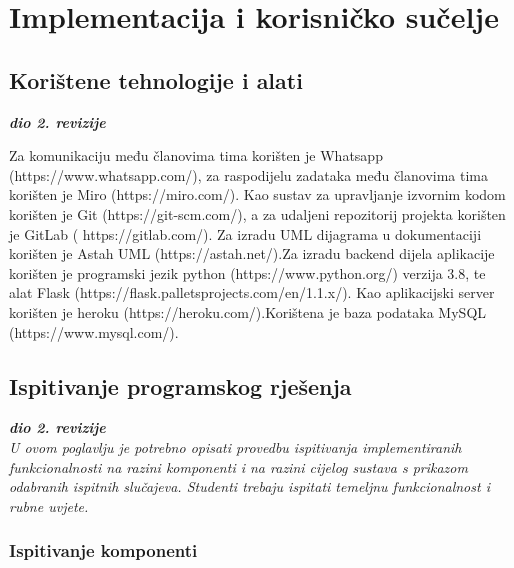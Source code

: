\chapter{Implementacija i korisničko sučelje}
		
		
		\section{Korištene tehnologije i alati}
		
			\textbf{\textit{dio 2. revizije}}
			
			 \noindent Za komunikaciju među članovima tima korišten je Whatsapp (https://www.whatsapp.com/), za raspodijelu zadataka među članovima tima korišten je Miro (https://miro.com/). Kao sustav za upravljanje izvornim kodom korišten je Git (https://git-scm.com/), a za udaljeni repozitorij projekta korišten je GitLab ( https://gitlab.com/). Za izradu UML dijagrama u dokumentaciji korišten je Astah UML (https://astah.net/).Za izradu backend dijela aplikacije korišten je programski jezik python (https://www.python.org/) verzija 3.8, te alat Flask (https://flask.palletsprojects.com/en/1.1.x/). Kao aplikacijski server korišten je heroku (https://heroku.com/).Korištena je baza podataka MySQL (https://www.mysql.com/).

			
			
			\eject 
		
	
		\section{Ispitivanje programskog rješenja}
			
			\textbf{\textit{dio 2. revizije}}\\
			
			 \textit{U ovom poglavlju je potrebno opisati provedbu ispitivanja implementiranih funkcionalnosti na razini komponenti i na razini cijelog sustava s prikazom odabranih ispitnih slučajeva. Studenti trebaju ispitati temeljnu funkcionalnost i rubne uvjete.}
	
			
			\subsection{Ispitivanje komponenti}
			
